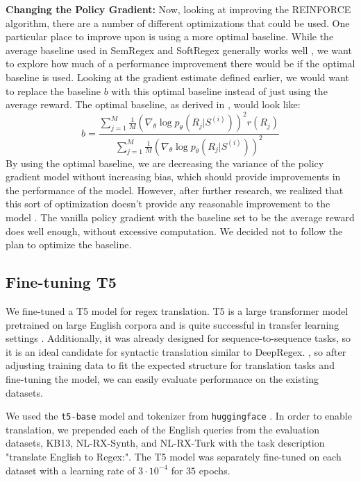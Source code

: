 \documentclass[11pt,a4paper]{article}
\begin{document}
\textbf{Changing the Policy Gradient:} Now, looking at improving the REINFORCE algorithm, there are a number of different optimizations that could be used. One particular place to improve upon is using a more optimal baseline. While the average baseline used in SemRegex and SoftRegex generally works well \cite{Williams:92}, we want to explore how much of a performance improvement there would be if the optimal baseline is used. Looking at the gradient estimate defined earlier, we would want to replace the baseline $b$ with this optimal baseline instead of just using the average reward. The optimal baseline, as derived in \cite{peters-schaal-2008}, would look like: $$ b = \frac{\sum_{j=1}^M \frac{1}{M} (\nabla_{\theta} \log p_{\theta}(R_j | S^{(i)}))^2 r(R_j)}{\sum_{j=1}^M \frac{1}{M} (\nabla_{\theta} \log p_{\theta}(R_j | S^{(i)}))^2}$$ By using the optimal baseline, we are decreasing the variance of the policy gradient model without increasing bias, which should provide improvements in the performance of the model. However, after further research, we realized that this sort of optimization doesn't provide any reasonable improvement to the model \cite{peters-schaal-2008}. The vanilla policy gradient with the baseline set to be the average reward does well enough, without excessive computation. We decided not to follow the plan to optimize the baseline.

\subsection{Fine-tuning T5}

We fine-tuned a T5 model for regex translation. T5 is a large transformer model pretrained on large English corpora and is quite successful in transfer learning settings \cite{2020t5}. Additionally, it was already designed for sequence-to-sequence tasks, so it is an ideal candidate for syntactic translation similar to DeepRegex. , so after adjusting training data to fit the expected structure for translation tasks and fine-tuning the model, we can easily evaluate performance on the existing datasets.

We used the \texttt{t5-base} model and tokenizer from \texttt{huggingface} \cite{2020t5}. In order to enable translation, we prepended each of the English queries from the evaluation datasets, KB13, NL-RX-Synth, and NL-RX-Turk with the task description "translate English to Regex:". The T5 model was separately fine-tuned on each dataset with a learning rate of $3 \cdot 10^{-4}$ for $35$ epochs. 
\end{document}
